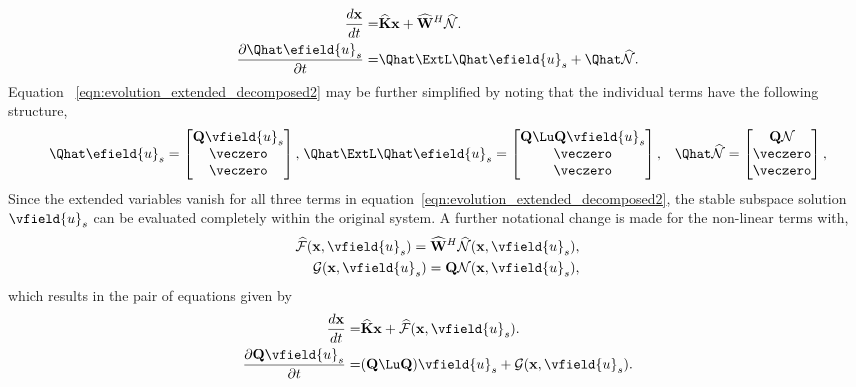\begin{subequations}
	\begin{align}
		\dfrac{d\mathbf{x}}{d t} =& \mathbf{\widehat{K}}\mathbf{x} + \mathbf{\widehat{W}}^{H}\mathcal{\widehat{N}} \label{eqn:evolution_extended_decomposed1}.\\
		\dfrac{\partial \Qhat \efield{u}_{s}}{\partial t} =& \Qhat\ExtL \Qhat\efield{u}_{s} + \Qhat\mathcal{\widehat{N}}
		 \label{eqn:evolution_extended_decomposed2}. 
	\end{align}
\end{subequations}
Equation~ \eqref{eqn:evolution_extended_decomposed2} may be further simplified by noting that the individual terms have the following structure,
\begin{align}
		\Qhat\efield{u}_{s} = 
		\begin{bmatrix}
			\mathbf{Q}\vfield{u}_{s} \\
			\veczero \\
			\veczero 
		\end{bmatrix}, &
		\hspace{1mm} \Qhat\ExtL\Qhat\efield{u}_{s} = 
		\begin{bmatrix}
			\mathbf{Q}\Lu\mathbf{Q}\vfield{u}_{s} \\
			\veczero \\
			\veczero 
		\end{bmatrix}, &
		\Qhat\mathcal{\widehat{N}} = 
		\begin{bmatrix}
			\mathbf{Q}\mathcal{N} \\
			\veczero \\
			\veczero 
		\end{bmatrix},	
	\nonumber
\end{align}
Since the extended variables vanish for all three terms in equation~\eqref{eqn:evolution_extended_decomposed2}, the stable subspace solution $\vfield{u}_{s}$ can be evaluated completely within the original system. A further notational change is made for the non-linear terms with,
\begin{eqnarray}
	\mathcal{\widehat{F}}(\mathbf{x},\vfield{u}_{s}) = \mathbf{\widehat{W}}^{H}\mathcal{\widehat{N}}(\mathbf{x},\vfield{u}_{s}), \nonumber \\
	\mathcal{G}(\mathbf{x},\vfield{u}_{s}) = \mathbf{Q}\mathcal{N}(\mathbf{x},\vfield{u}_{s}), \nonumber
\end{eqnarray} 
which results in the pair of equations given by
\begin{subequations}
	\begin{align}
		\dfrac{d\mathbf{x}}{d t} =& \mathbf{\widehat{K}}\mathbf{x} + \mathcal{\widehat{F}}(\mathbf{x},\vfield{u}_{s}) \label{eqn:evolution_final1}.\\
		\dfrac{\partial \mathbf{Q}\vfield{u}_{s}}{\partial t} =& (\mathbf{Q}\Lu \mathbf{Q})\vfield{u}_{s} + \mathcal{G}(\mathbf{x},\vfield{u}_{s})
		\label{eqn:evolution_final2}. 
	\end{align}
	\label{eqn:evolution_final}
\end{subequations}
 
